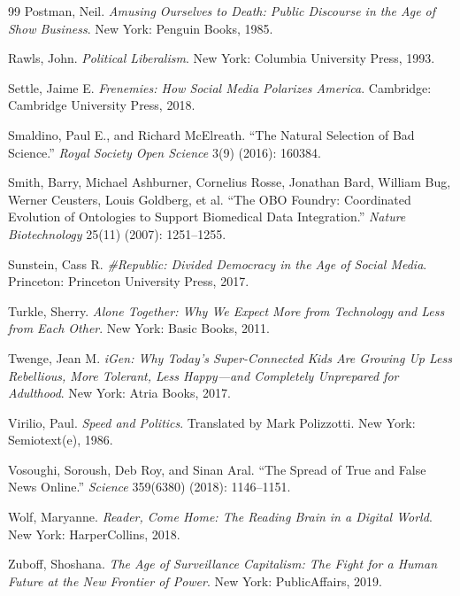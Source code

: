 \documentclass[12pt]{article}
\begin{document}
\begin{thebibliography}{99}
Postman, Neil.
\newblock \emph{Amusing Ourselves to Death: Public Discourse in the Age of Show Business}.
\newblock New York: Penguin Books, 1985.

Rawls, John.
\newblock \emph{Political Liberalism}.
\newblock New York: Columbia University Press, 1993.

Settle, Jaime E.
\newblock \emph{Frenemies: How Social Media Polarizes America}.
\newblock Cambridge: Cambridge University Press, 2018.

Smaldino, Paul E., and Richard McElreath.
\newblock ``The Natural Selection of Bad Science.''
\newblock \emph{Royal Society Open Science} 3(9) (2016): 160384.

Smith, Barry, Michael Ashburner, Cornelius Rosse, Jonathan Bard, William Bug, Werner Ceusters, Louis Goldberg, et al.
\newblock ``The OBO Foundry: Coordinated Evolution of Ontologies to Support Biomedical Data Integration.''
\newblock \emph{Nature Biotechnology} 25(11) (2007): 1251--1255.

Sunstein, Cass R.
\newblock \emph{\#Republic: Divided Democracy in the Age of Social Media}.
\newblock Princeton: Princeton University Press, 2017.

Turkle, Sherry.
\newblock \emph{Alone Together: Why We Expect More from Technology and Less from Each Other}.
\newblock New York: Basic Books, 2011.

Twenge, Jean M.
\newblock \emph{iGen: Why Today's Super-Connected Kids Are Growing Up Less Rebellious, More Tolerant, Less Happy---and Completely Unprepared for Adulthood}.
\newblock New York: Atria Books, 2017.

Virilio, Paul.
\newblock \emph{Speed and Politics}.
\newblock Translated by Mark Polizzotti. New York: Semiotext(e), 1986.

Vosoughi, Soroush, Deb Roy, and Sinan Aral.
\newblock ``The Spread of True and False News Online.''
\newblock \emph{Science} 359(6380) (2018): 1146--1151.

Wolf, Maryanne.
\newblock \emph{Reader, Come Home: The Reading Brain in a Digital World}.
\newblock New York: HarperCollins, 2018.

Zuboff, Shoshana.
\newblock \emph{The Age of Surveillance Capitalism: The Fight for a Human Future at the New Frontier of Power}.
\newblock New York: PublicAffairs, 2019.

\end{thebibliography}
\end{document}
